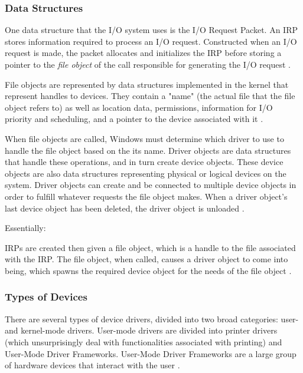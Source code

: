 \documentclass[10pt,draftclsnofoot,onecolumn,compsoc]{IEEEtran}
\begin{document}
	
	\subsubsection{Data Structures}
	
	One data structure that the I/O system uses is the I/O Request Packet. An IRP stores information required to process an I/O request. Constructed when an I/O request is made, the packet allocates and initializes the IRP before storing a pointer to the \textit{file object} of the call responsible for generating the I/O request \cite{WInternals}.
	
	File objects are represented by data structures implemented in the kernel that represent handles to devices. They contain a "name" (the actual file that the file object refers to) as well as location data, permissions, information for I/O priority and scheduling, and a pointer to the device associated with it \cite{WInternals}.
	
	When file objects are called, Windows must determine which driver to use to handle the file object based on the its name. Driver objects are data structures that handle these operations, and in turn create device objects. These device objects are also data structures representing physical or logical devices on the system. Driver objects can create and be connected to multiple device objects in order to fulfill whatever requests the file object makes. When a driver object's last device object has been deleted, the driver object is unloaded \cite{WInternals}.
	
	Essentially:
	
	IRPs are created then given a file object, which is a handle to the file associated with the IRP. The file object, when called, causes a driver object to come into being, which spawns the required device object for the needs of the file object \cite{WInternals}.
	
	\subsubsection{Types of Devices}
	
	There are several types of device drivers, divided into two broad categories: user- and kernel-mode drivers. User-mode drivers are divided into printer drivers (which unsurprisingly deal with functionalities associated with printing) and User-Mode Driver Frameworks. User-Mode Driver Frameworks are a large group of hardware devices that interact with the user \cite{WInternals}.
	
\end{document}
